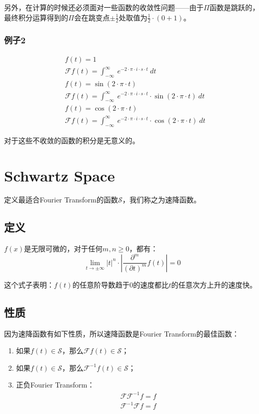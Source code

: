 另外，在计算的时候还必须面对一些函数的收敛性问题——由于$\Pi$函数是跳跃的，最终积分运算得到的$\Pi$会在跳变点$\pm \frac{1}{2}$处取值为$\frac{1}{2}\cdot (0+1)$。
\subsubsection{例子2}
\begin{align*}
	 & f(t)  =1                                                                                                       \\
	 & \mathcal{F}f(t)=\int_{-\infty}^{\infty}\ e^{-2\cdot \pi\cdot i\cdot s\cdot t}\ dt                              \\
	 & f(t) =\sin(2\cdot\pi\cdot t)                                                                                   \\
	 & \mathcal{F}f(t)  =\int_{-\infty}^{\infty}\ e^{-2\cdot \pi\cdot i\cdot s\cdot t}\cdot\sin(2\cdot\pi\cdot t)\ dt \\
	 & f(t)=\cos(2\cdot\pi\cdot t)                                                                                    \\
	 & \mathcal{F}f(t)=\int_{-\infty}^{\infty}\ e^{-2\cdot \pi\cdot i\cdot s\cdot t}\cdot \cos(2\cdot\pi\cdot t)\ dt
\end{align*}

对于这些不收敛的函数的积分是无意义的。
\section{Schwartz Space}
定义最适合Fourier Transform的函数$\mathcal  {S}$，我们称之为速降函数。
\subsection{定义}
$f(x)$是无限可微的，对于任何$m,n\geq 0$，都有：
$$
	\lim\limits_{t\rightarrow\pm\infty}|t|^n\cdot |\frac{\partial^m}{(\partial t)^m}f(t)|=0
$$

这个式子表明：$f(t)$的任意阶导数趋于$0$的速度都比$t$的任意次方上升的速度快。
\subsection{性质}
因为速降函数有如下性质，所以速降函数是Fourier Transform的最佳函数：
\begin{enumerate}
	\item 如果$f(t)\in \mathcal  {S}$，那么$\mathcal{F}f(t)\in \mathcal  {S}$；
	\item 如果$f(t)\in \mathcal  {S}$，那么$\mathcal{F}^{-1}f(t)\in \mathcal  {S}$；
	\item 正负Fourier Transform：
	      \begin{align*}
		      \mathcal{F}\mathcal{F}^{-1}f=f \\
		      \mathcal{F}^{-1}\mathcal{F}f=f
	      \end{align*}
\end{enumerate}

